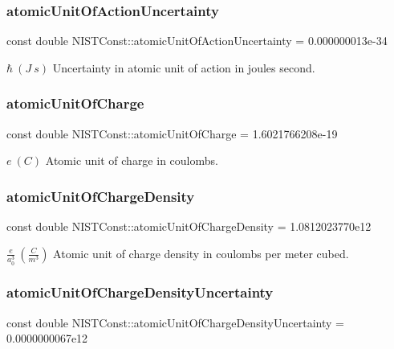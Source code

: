 \subsubsection{\texorpdfstring{atomic\+Unit\+Of\+Action\+Uncertainty}{atomicUnitOfActionUncertainty}}
{\footnotesize\ttfamily const double N\+I\+S\+T\+Const\+::atomic\+Unit\+Of\+Action\+Uncertainty = 0.\+000000013e-\/34}

$\hbar \ (J\ s)$ Uncertainty in atomic unit of action in joules second. \mbox{\label{group___n_i_s_t_const-_atomic_unit_ga1a42bd5db581dc5bf7a87b864bc77cf4}} 
\subsubsection{\texorpdfstring{atomic\+Unit\+Of\+Charge}{atomicUnitOfCharge}}
{\footnotesize\ttfamily const double N\+I\+S\+T\+Const\+::atomic\+Unit\+Of\+Charge = 1.\+6021766208e-\/19}

$e \ (C)$ Atomic unit of charge in coulombs. \mbox{\label{group___n_i_s_t_const-_atomic_unit_gaa1918065ee8731837afe6bddee194320}} 
\subsubsection{\texorpdfstring{atomic\+Unit\+Of\+Charge\+Density}{atomicUnitOfChargeDensity}}
{\footnotesize\ttfamily const double N\+I\+S\+T\+Const\+::atomic\+Unit\+Of\+Charge\+Density = 1.\+0812023770e12}

$\frac{e}{a_0^3} \ (\frac{C}{m^3})$ Atomic unit of charge density in coulombs per meter cubed. \mbox{\label{group___n_i_s_t_const-_atomic_unit_ga3038b11b5fde2681f59e7dbbe32a44ab}} 
\subsubsection{\texorpdfstring{atomic\+Unit\+Of\+Charge\+Density\+Uncertainty}{atomicUnitOfChargeDensityUncertainty}}
{\footnotesize\ttfamily const double N\+I\+S\+T\+Const\+::atomic\+Unit\+Of\+Charge\+Density\+Uncertainty = 0.\+0000000067e12}

